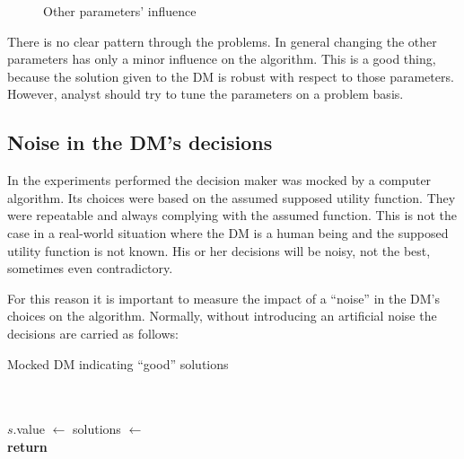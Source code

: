 \begin{figure}
{{    }
  }
  \caption{Other parameters' influence}
  \label{params2}
\end{figure}

There is no clear pattern through the problems. In general changing the other
parameters has only a minor influence on the algorithm. This is a good thing,
because the solution given to the DM is robust with respect to those
parameters. However, analyst should try to tune the parameters on a problem
basis.

\subsection{Noise in the DM's decisions}

In the experiments performed the decision maker was mocked by a computer
algorithm. Its choices were based on the assumed supposed utility
function. They were repeatable and always complying with the assumed
function. This is not the case in a real-world situation where the DM is a
human being and the supposed utility function is not known. His or her
decisions will be noisy, not the best, sometimes even contradictory.

For this reason it is important to measure the impact of a ``noise'' in the
DM's choices on the algorithm. Normally, without introducing an artificial
noise the decisions are carried as follows:

\begin{algorithm}
\caption{Mocked DM indicating ``good'' solutions}\label{alg:dmselection}
  \begin{algorithmic}[1]
     \\
     \\
    \State $s.$value $\gets$ 
    \EndFor
    \State solutions $\gets$  \\
    \State \textbf{return} 
    \EndProcedure
  \end{algorithmic}
\end{algorithm}

